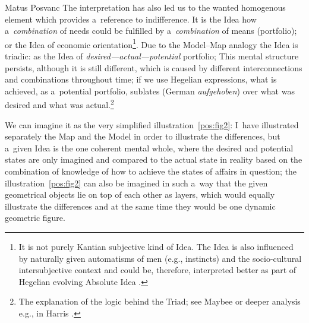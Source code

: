 \begin{artengenv}{Matus Posvanc}
The interpretation has also led us to the wanted homogenous element which provides a~reference to indifference. It is the Idea how a~\textit{combination} of needs could be fulfilled by a~\textit{combination} of means (portfolio); or the Idea of economic orientation\footnote{It is not purely Kantian subjective kind of Idea. The Idea is also influenced by naturally given automatisms of men (e.g., instincts) and the socio-cultural intersubjective context and could be, therefore, interpreted better as part of Hegelian evolving Absolute Idea 
\parencite[see interpretation of Hegelian logic by][]{Harris1983Interpretation}. %
 }. Due to the Model–Map analogy the Idea is triadic: as the Idea of \textit{desired---actual---potential} portfolio; This mental structure persists, although it is still different, which is caused by different interconnections and combinations throughout time; if we use Hegelian expressions, what is achieved, as a~potential portfolio, sublates (German \textit{aufgehoben}) over what was desired and what was actual.\footnote{The explanation of the logic behind the Triad; see Maybee 
\parencite*[][]{Maybee2020Hegels} %
 or deeper analysis e.g., in Harris 
\parencite*[][]{Harris1983Interpretation}.%
}



We can imagine it as the very simplified illustration~\ref{pos:fig2}: I~have illustrated separately the Map and the Model in order to illustrate the differences, but a~given Idea is the one coherent mental whole, where the desired and potential states are only imagined and compared to the actual state in reality based on the combination of knowledge of how to achieve the states of affairs in question; the illustration~\ref{pos:fig2} can also be imagined in such a~way that the given geometrical objects lie on top of each other as layers, which would equally illustrate the differences and at the same time they would be one dynamic geometric figure.



\end{artengenv}
